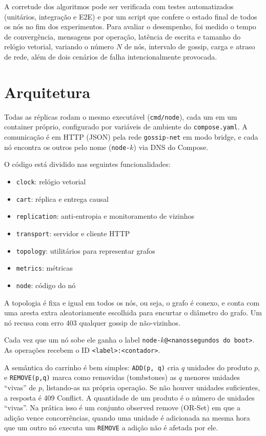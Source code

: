 \documentclass[conference,a4paper]{IEEEtran}
\begin{document}
A corretude dos algoritmos pode ser verificada com testes automatizados (unitários, integração e E2E) e por um script que confere o estado final de todos os nós no fim dos experimentos. Para avaliar o desempenho, foi medido o tempo de convergência, mensagens por operação, latência de escrita e tamanho do relógio vetorial, variando o número $N$ de nós, intervalo de gossip, carga e atraso de rede, além de dois cenários de falha intencionalmente provocada.

\section{Arquitetura}\label{sec:arq}
Todas as réplicas rodam o mesmo executável (\texttt{cmd/node}), cada um em um
container próprio, configurado por variáveis de ambiente do \texttt{compose.yaml}. A comunicação é em HTTP (JSON) pela rede \texttt{gossip-net} em modo bridge, e cada nó encontra os outros pelo nome (\texttt{node-$k$}) via DNS do Compose.

O código está dividido nas seguintes funcionalidades:

\begin{itemize}
    \item \texttt{clock}: relógio vetorial
    \item \texttt{cart}: réplica e entrega causal
    \item \texttt{replication}: anti-entropia e monitoramento de vizinhos
    \item \texttt{transport}: servidor e cliente HTTP
    \item \texttt{topology}: utilitários para representar grafos
    \item \texttt{metrics}: métricas
    \item \texttt{node}: código do nó
\end{itemize}

A topologia é fixa e igual em todos os nós, ou seja, o grafo é conexo, e conta com uma aresta extra aleatoriamente escolhida para encurtar o diâmetro do grafo. Um nó recusa com erro 403 qualquer gossip de não-vizinhos.

Cada vez que um nó sobe ele ganha o label \texttt{node-$k$@<nanossegundos do boot>}. As operações recebem o ID \texttt{<label>:<contador>}.

A semântica do carrinho é bem simples: \texttt{ADD(p, q)} cria $q$ unidades do produto
$p$, e \texttt{REMOVE(p,q)} marca como removidas (tombstones) as $q$
menores unidades ``vivas'' de $p$, listando-as na própria operação. Se não houver unidades suficientes, a resposta é 409 Conflict. A quantidade de um produto é o número de unidades ``vivas''. Na prática isso é um conjunto observed remove (OR-Set) em que a adição vence concorrências, quando uma unidade é adicionada na mesma hora que um outro nó executa um \texttt{REMOVE} a adição não é afetada por ele.
\end{document}
